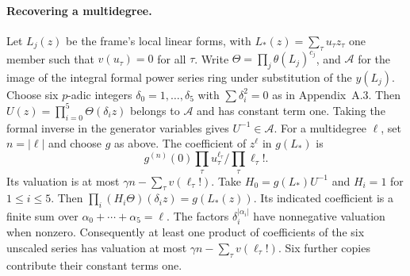 \paragraph{Recovering a multidegree.}
Let $L_j(z)$ be the frame's local linear forms, with
$L_*(z)=\sum_\tau u_\tau z_\tau$ one member such that $v(u_\tau)=0$
for all $\tau$. Write $\Theta=\prod_j\theta(L_j)^{c_j}$, and
$\mathcal A$ for the image of the integral formal power series ring
under substitution of the $y(L_j)$. Choose six $p$-adic integers
$\delta_0=1,\ldots,\delta_5$ with $\sum\delta_i^2=0$ as in Appendix~A.3.
Then $U(z)=\prod_{i=0}^5\Theta(\delta_i z)$ belongs to $\mathcal A$ and
has constant term one. Taking the formal inverse in the generator
variables gives $U^{-1}\in\mathcal A$.
For a multidegree $\ell$, set $n=|\ell|$ and choose $g$ as above.
The coefficient of $z^\ell$ in $g(L_*)$ is
\[
 g^{(n)}(0)\prod_\tau u_\tau^{\ell_\tau}/\prod_\tau\ell_\tau!.
\]
Its valuation is at most $\gamma n-\sum_\tau v(\ell_\tau!)$.
Take $H_0=g(L_*)U^{-1}$ and $H_i=1$ for $1\le i\le5$. Then
$\prod_i(H_i\Theta)(\delta_i z)=g(L_*(z))$.
Its indicated coefficient is a finite sum over
$\alpha_0+\cdots+\alpha_5=\ell$. The factors
$\delta_i^{|\alpha_i|}$ have nonnegative valuation when nonzero.
Consequently at least one product of coefficients of the six unscaled
series has valuation at most $\gamma n-\sum_\tau v(\ell_\tau!)$.
Six further copies contribute their constant terms one.


